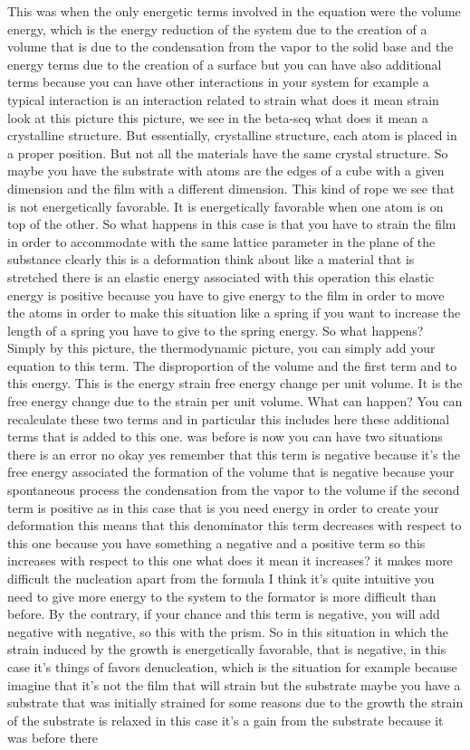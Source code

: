 This was when the only energetic terms involved in the equation were the volume energy, which is the energy reduction of the system due to the creation of a volume that is due to the condensation from the vapor to the solid base and the energy terms due to the creation of a surface but you can have also additional terms because you can have other interactions in your system for example a typical interaction is an interaction related to strain what does it mean strain look at this picture this picture, we see in the beta-seq what does it mean a crystalline structure. But essentially, crystalline structure, each atom is placed in a proper position. But not all the materials have the same crystal structure. So maybe you have the substrate with atoms are the edges of a cube with a given dimension and the film with a different dimension. This kind of rope we see that is not energetically favorable. It is energetically favorable when one atom is on top of the other. So what happens in this case is that you have to strain the film in order to accommodate with the same lattice parameter in the plane of the substance clearly this is a deformation think about like a material that is stretched there is an elastic energy associated with this operation this elastic energy is positive because you have to give energy to the film in order to move the atoms in order to make this situation like a spring if you want to increase the length of a spring you have to give to the spring energy. So what happens? Simply by this picture, the thermodynamic picture, you can simply add your equation to this term. The disproportion of the volume and the first term and to this energy. This is the energy strain free energy change per unit volume. It is the free energy change due to the strain per unit volume. What can happen? You can recalculate these two terms and in particular this includes here these additional terms that is added to this one. was before is now you can have two situations there is an error no okay yes remember that this term is negative because it's the free energy associated the formation of the volume that is negative because your spontaneous process the condensation from the vapor to the volume if the second term is positive as in this case that is you need energy in order to create your deformation this means that this denominator this term decreases with respect to this one because you have something a negative and a positive term so this increases with respect to this one what does it mean it increases? it makes more difficult the nucleation apart from the formula I think it's quite intuitive you need to give more energy to the system to the formator is more difficult than before. By the contrary, if your chance and this term is negative, you will add negative with negative, so this with the prism. So in this situation in which the strain induced by the growth is energetically favorable, that is negative, in this case it's things of favors denucleation, which is the situation for example because imagine that it's not the film that will strain but the substrate maybe you have a substrate that was initially strained for some reasons due to the growth the strain of the substrate is relaxed in this case it's a gain from the substrate because it was before there 